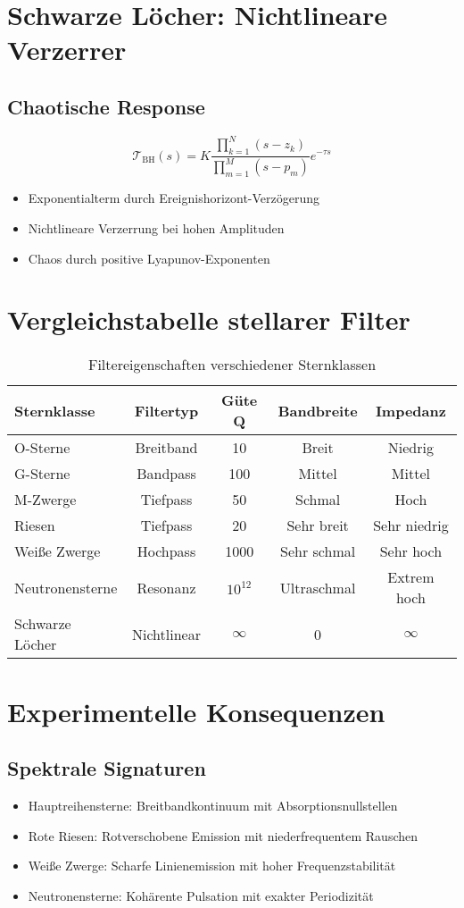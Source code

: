 \section{Schwarze Löcher: Nichtlineare Verzerrer}

\subsection{Chaotische Response}
\[
\mathcal{T}_{\text{BH}}(s) = K\frac{\prod_{k=1}^N (s - z_k)}{\prod_{m=1}^M (s - p_m)} e^{-\tau s}
\]
\begin{itemize}
\item Exponentialterm durch Ereignishorizont-Verzögerung
\item Nichtlineare Verzerrung bei hohen Amplituden
\item Chaos durch positive Lyapunov-Exponenten
\end{itemize}

\section{Vergleichstabelle stellarer Filter}

\begin{table}[ht]
\centering
\begin{tabular}{lcccc}
\hline
Sternklasse & Filtertyp & Güte Q & Bandbreite & Impedanz \\
\hline
O-Sterne & Breitband & 10 & Breit & Niedrig \\
G-Sterne & Bandpass & 100 & Mittel & Mittel \\
M-Zwerge & Tiefpass & 50 & Schmal & Hoch \\
Riesen & Tiefpass & 20 & Sehr breit & Sehr niedrig \\
Weiße Zwerge & Hochpass & 1000 & Sehr schmal & Sehr hoch \\
Neutronensterne & Resonanz & $10^{12}$ & Ultraschmal & Extrem hoch \\
Schwarze Löcher & Nichtlinear & $\infty$ & 0 & $\infty$ \\
\hline
\end{tabular}
\caption{Filtereigenschaften verschiedener Sternklassen}
\end{table}

\section{Experimentelle Konsequenzen}

\subsection{Spektrale Signaturen}
\begin{itemize}
\item Hauptreihensterne: Breitbandkontinuum mit Absorptionsnullstellen
\item Rote Riesen: Rotverschobene Emission mit niederfrequentem Rauschen
\item Weiße Zwerge: Scharfe Linienemission mit hoher Frequenzstabilität
\item Neutronensterne: Kohärente Pulsation mit exakter Periodizität
\end{itemize}


